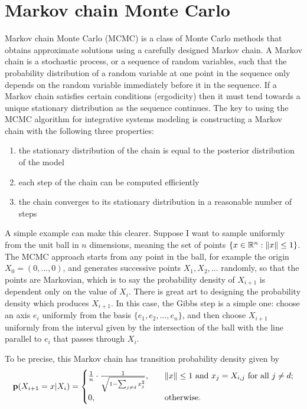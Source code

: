 \section{Markov chain Monte Carlo}
Markov chain Monte Carlo (MCMC) is a class of Monte Carlo methods that
obtains approximate solutions using a carefully designed Markov
chain. A Markov chain is a stochastic process, or a sequence of random
variables, such that the probability distribution of a random variable
at one point in the sequence only depends on the random variable
immediately before it in the sequence. If a Markov chain satisfies
certain conditions (ergodicity) then it must tend towards a unique stationary
distribution as the sequence continues. The key to using the MCMC
algorithm for integrative systems modeling is constructing a Markov
chain with the following three properties:
\begin{enumerate}
\item the stationary distribution of the chain is equal to the
  posterior distribution of the model
\item each step of the chain can be computed efficiently
\item the chain converges to its stationary distribution in a
  reasonable number of steps
\end{enumerate}

A simple example can make this clearer. Suppose I want to sample
uniformly from the unit ball in $n$ dimensions, meaning the set of
points $\{x \in \mathbb{R}^n: \|x\| \leq 1\}$.  The MCMC approach starts
from any point in the ball, for example the origin $X_0 = (0, \ldots,
0)$, and generates successive points $X_1, X_2, \ldots$ randomly, so
that the points are Markovian, which is to say the probability density
of $X_{i+1}$ is dependent only on the value of $X_i$.  There is great
art to designing the probability density which produces $X_{i+1}$.  In
this case, the Gibbs step is a simple one: choose an axis $e_i$
uniformly from the basis $\{e_1, e_2, \ldots, e_n\}$, and then choose
$X_{i+1}$ uniformly from the interval given by the
intersection of the ball with the line parallel to $e_i$ that passes through $X_i$.

To be precise, this Markov chain has transition probability density given by
\[
\mathbf{p}(X_{i+1}=x|X_i) = 
\begin{cases}
\frac{1}{n}\cdot\frac{1}{\sqrt{1-\sum_{j \neq d} x_j^2}}, &\quad\|x\| \leq 1 \text{ and } x_j = X_{i,j} \text{ for all }j \neq d;\\
0, &\quad\text{otherwise.}
\end{cases}
\]

